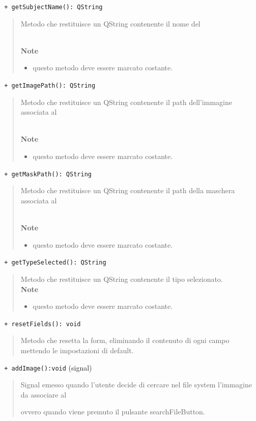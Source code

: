 \color{blue}\verb! + getSubjectName(): QString!
\begin{quote}
\color{black} Metodo che restituisce un QString contenente il nome del \subject{} \\
 \textbf{Note}
 \begin{itemize}
 \item questo metodo deve essere marcato costante.
 \end{itemize}
\end{quote}
\color{blue}\verb! + getImagePath(): QString!
\begin{quote}
\color{black} Metodo che restituisce un QString contenente il path dell'immagine associata al \subject{} \\
 \textbf{Note}
 \begin{itemize}
 \item questo metodo deve essere marcato costante.
 \end{itemize}
\end{quote}
\color{blue}\verb! + getMaskPath(): QString!
\color{black}
\begin{quote}
 Metodo che restituisce un QString contenente il path della maschera associata al \subject{} \\
 \textbf{Note}
 \begin{itemize}
 \item questo metodo deve essere marcato costante.
 \end{itemize}
\end{quote}
\color{blue}\verb! + getTypeSelected(): QString!
\color{black}
\begin{quote}
 Metodo che restituisce un QString contenente il tipo selezionato.\\
 \textbf{Note}
 \begin{itemize}
 \item questo metodo deve essere marcato costante.
 \end{itemize}
\end{quote}
\color{blue}\verb! + resetFields(): void!
\color{black}
\begin{quote}
 Metodo che resetta la form, eliminando il contenuto di ogni campo mettendo le impostazioni di default.\\
\end{quote}
\color{blue}\verb! + addImage():void! (signal)
\color{black} 
\begin{quote}
Signal\g{} emesso quando l'utente decide di cercare nel file system l'immagine da associare al \subject{} ovvero quando viene premuto il pulsante searchFileButton.
\end{quote}
